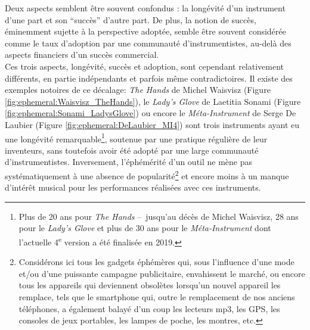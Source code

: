 \noindent Deux aspects semblent être souvent confondus : la longévité d'un instrument d'une part et son ``succès'' d'autre part. De plus, la notion de succès, éminemment sujette à la perspective adoptée, semble être souvent considérée comme le taux d'adoption par une communauté d'instrumentistes, au-delà des aspects financiers d'un succès commercial.\\
\indent Ces trois aspects, longévité, succès et adoption, sont cependant relativement différents, en partie indépendants et parfois même contradictoires. Il existe des exemples notoires de ce décalage: \textit{The Hands} de Michel Waisvisz \cite{torre_hands:_2016} (Figure \ref{fig:ephemeral:Waisvisz_TheHands}), le \textit{Lady's Glove} de Laetitia Sonami \cite{sonami_my_2006} (Figure \ref{fig:ephemeral:Sonami_LadysGlove}) ou encore le \textit{Méta-Instrument} de Serge De Laubier \cite{couprie_meta-instrument:_2018} (Figure \ref{fig:ephemeral:DeLaubier_MI4}) sont trois instruments ayant eu une longévité remarquable\footnote{Plus de 20 ans pour \textit{The Hands} --~jusqu'au décès de Michel Waisvisz, 28 ans pour le \textit{Lady's Glove} et plus de 30 ans pour le \textit{Méta-Instrument} dont l'actuelle 4\textsuperscript{e} version a été finalisée en 2019.}, soutenue par une pratique régulière de leur inventeurs, sans toutefois avoir été adopté par une large communauté d'instrumentistes. Inversement, l'éphémérité d'un outil ne mène pas systématiquement à une absence de popularité\footnote{Considérons ici tous les gadgets éphémères qui, sous l'influence d'une mode et/ou d'une puissante campagne publicitaire, envahissent le marché, ou encore tous les appareils qui deviennent obsolètes lorsqu'un nouvel appareil les remplace, tels que le smartphone qui, outre le remplacement de nos anciens téléphones, a également balayé d'un coup les lecteurs mp3, les GPS, les consoles de jeux portables, les lampes de poche, les montres, etc.} et encore moins à un manque d'intérêt musical pour les performances réalisées avec ces instruments.\\
